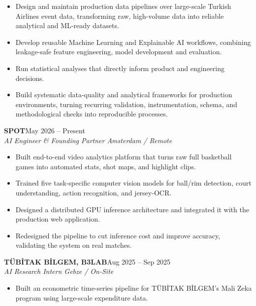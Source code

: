 \documentclass[a4paper,10pt]{article}
\newcommand{\entry}[3]{
    \textbf{#1}\hfill #2\\[-1pt]
    \textit{#3}\par
}
\begin{document}
\begin{itemize}
    \item Design and maintain production data pipelines over large-scale Turkish Airlines event data, transforming raw, high-volume data into reliable analytical and ML-ready datasets.
    \item Develop reusable Machine Learning and Explainable AI workflows, combining leakage-safe feature engineering, model development and evaluation.
    \item Run statistical analyses that directly inform product and engineering decisions.
    \item Build systematic data-quality and analytical frameworks for production environments, turning recurring validation, instrumentation, schema, and methodological checks into reproducible processes.
\end{itemize}

\vspace{1pt}

\entry
{SPOT}
{May 2026 -- Present}
{AI Engineer \& Founding Partner \textperiodcentered{} Amsterdam / Remote}

\begin{itemize}
    \item Built end-to-end video analytics platform that turns raw full basketball games into automated stats, shot maps, and highlight clips.
    \item Trained five task-specific computer vision models for ball/rim detection, court understanding, action recognition, and jersey-OCR.
    \item Designed a distributed GPU inference architecture and integrated it with the production web application.
    \item Redesigned the pipeline to cut inference cost and improve accuracy, validating the system on real matches.
\end{itemize}

\vspace{1pt}

\entry
{TÜBİTAK BİLGEM, B3LAB}
{Aug 2025 -- Sep 2025}
{AI Research Intern  \textperiodcentered{} Gebze / On-Site}

\begin{itemize}
    \item Built an econometric time-series pipeline for TÜBİTAK BİLGEM's Mali Zeka program using large-scale expenditure data.
\end{itemize}

\vspace{1pt}
\end{document}
